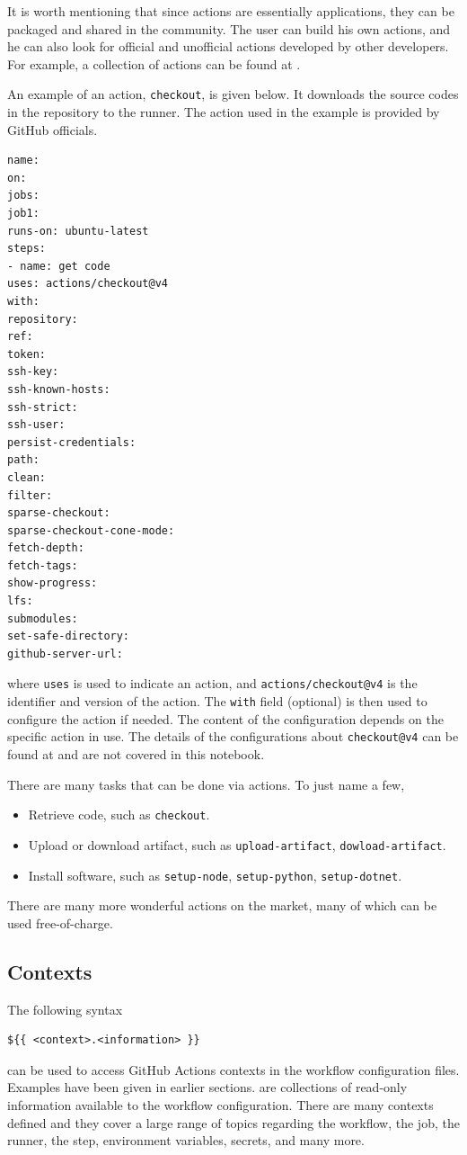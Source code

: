 It is worth mentioning that since actions are essentially applications, they can be packaged and shared in the community. The user can build his own actions, and he can also look for official and unofficial actions developed by other developers. For example, a collection of actions can be found at \cite{git2025actions}.

An example of an action, \verb|checkout|, is given below. It downloads the source codes in the repository to the runner. The action used in the example is provided by GitHub officials.
\begin{lstlisting}
name:
on:
jobs:
job1:
runs-on: ubuntu-latest
steps:
- name: get code
uses: actions/checkout@v4
with:
repository:
ref:
token:
ssh-key:
ssh-known-hosts:
ssh-strict:
ssh-user:
persist-credentials:
path:
clean:
filter:
sparse-checkout:
sparse-checkout-cone-mode:
fetch-depth:
fetch-tags:
show-progress:
lfs:
submodules:
set-safe-directory:
github-server-url:
\end{lstlisting}
where \verb|uses| is used to indicate an action, and \verb|actions/checkout@v4| is the identifier and version of the action. The \verb|with| field (optional) is then used to configure the action if needed. The content of the configuration depends on the specific action in use. The details of the configurations about \verb|checkout@v4| can be found at \cite{git2025actions} and are not covered in this notebook. 

There are many tasks that can be done via actions. To just name a few,
\begin{itemize}
	\item Retrieve code, such as \verb|checkout|.
	\item Upload or download artifact, such as \verb|upload-artifact|, \verb|dowload-artifact|.
	\item Install software, such as \verb|setup-node|, \verb|setup-python|, \verb|setup-dotnet|.
\end{itemize}
There are many more wonderful actions on the market, many of which can be used free-of-charge.

\subsection{Contexts}

The following syntax 
\begin{lstlisting}
${{ <context>.<information> }}
\end{lstlisting}
can be used to access GitHub Actions contexts in the workflow configuration files. Examples have been given in earlier sections.  are collections of read-only information available to the workflow configuration. There are many contexts defined and they cover a large range of topics regarding the workflow, the job, the runner, the step, environment variables, secrets, and many more.

